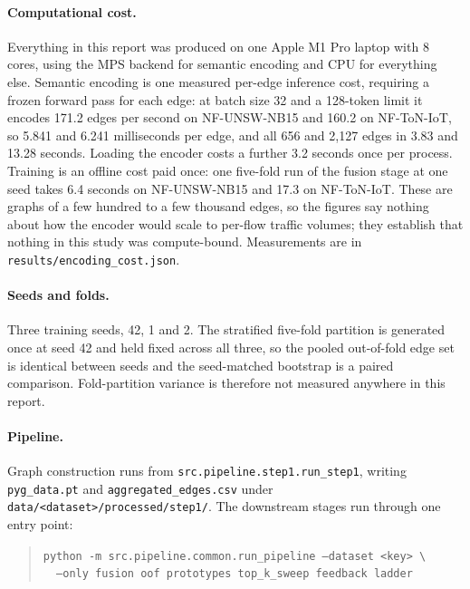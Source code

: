\paragraph{Computational cost.} Everything in this report was produced on one Apple M1 Pro
laptop with 8 cores, using the MPS backend for semantic encoding and CPU for everything else.
Semantic encoding is one measured per-edge inference cost, requiring a frozen forward pass for each edge: at batch size 32 and a 128-token limit it
encodes 171.2 edges per second on NF-UNSW-NB15 and 160.2 on NF-ToN-IoT, so 5.841 and 6.241
milliseconds per edge, and all 656 and 2{,}127 edges in 3.83 and 13.28 seconds. Loading the
encoder costs a further 3.2 seconds once per process. Training is an offline cost paid once:
one five-fold run of the fusion stage at one seed takes 6.4 seconds on NF-UNSW-NB15 and 17.3
on NF-ToN-IoT. These are graphs of a few hundred to a few thousand edges, so the figures say
nothing about how the encoder would scale to per-flow traffic volumes; they establish that
nothing in this study was compute-bound. Measurements are in
\texttt{results/encoding\_cost.json}.

\paragraph{Seeds and folds.} Three training seeds, 42, 1 and 2. The stratified five-fold
partition is generated once at seed 42 and held fixed across all three, so the pooled
out-of-fold edge set is identical between seeds and the seed-matched bootstrap is a paired
comparison. Fold-partition variance is therefore not measured anywhere in this report.

\paragraph{Pipeline.} Graph construction runs from
\texttt{src.pipeline.step1.run\_step1}, writing \texttt{pyg\_data.pt} and
\texttt{aggregated\_edges.csv} under \texttt{data/<dataset>/processed/step1/}. The downstream
stages run through one entry point:

\begin{quote}
\texttt{python -m src.pipeline.common.run\_pipeline --dataset <key> \textbackslash} \\
\texttt{\ \ --only fusion oof prototypes top\_k\_sweep feedback ladder}
\end{quote}

